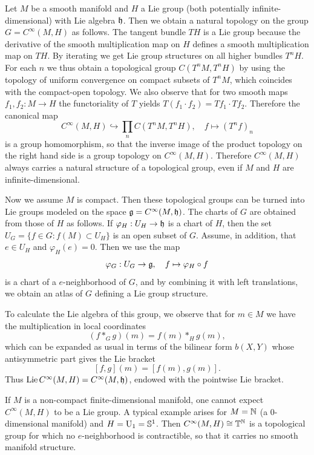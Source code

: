 \begin{example}
    Let $M$ be a smooth manifold and $H$ a Lie group (both potentially infinite-dimensional) with Lie algebra $\mathfrak{h}$. Then we obtain a natural topology on the group $G=C^\infty(M,H)$ as follows. The tangent bundle $TH$ is a Lie group because the derivative of the smooth  multiplication map on $H$ defines a smooth multiplication map on $TH$. By iterating we get Lie group structures on all higher bundles $T^n H$. For each $n$ we thus obtain a topological group $C(T^nM,T^nH)$ by using the topology of uniform convergence on compact subsets of $T^nM$, which coincides with the compact-open topology. We also observe that for two smooth maps $f_1,f_2:M\to H$ the functoriality of $T$ yields $T(f_1\cdot f_2)=Tf_1\cdot Tf_2.$ Therefore the canonical map
    \[C^\infty(M,H)\hookrightarrow \prod_{n}C(T^nM,T^nH),\quad f\mapsto (T^nf)_n\]
    is a group homomorphism, so that the inverse image of the product topology on the right hand side is a group topology on $C^\infty(M,H)$. Therefore $C^\infty(M,H)$ always carries a natural structure of a topological group, even if $M$ and $H$ are infinite-dimensional.

    Now we assume $M$ is compact. Then these topological groups can be turned into Lie groups modeled on the space $\mathfrak{g}=C^\infty(M,\mathfrak{h})$. The charts of $G$ are obtained from those of $H$ as follows. If $\varphi_H:U_H\to \mathfrak{h}$ is a chart of $H$, then the set $U_G=\{f\in G:f(M)\subset U_H\}$ is an open subset of $G$. Assume, in addition, that $e\in U_H$ and $\varphi_H(e)=0$. Then we use the map 
    \[\varphi_G:U_G\to\mathfrak{g},\quad f\mapsto \varphi_H\circ f\]
    is a chart of a $e$-neighborhood of $G$, and by combining it with left translations, we obtain an atlas of $G$ defining a Lie group structure.

    To calculate the Lie algebra of this group, we observe that for $m\in M$ we have the multiplication in local coordinates
    \[(f\ast_G g)(m)=f(m)\ast_H g(m),\]
    which can be expanded as usual in terms of the bilinear form $b(X,Y)$ whose antisymmetric part gives the Lie bracket
    \[[f,g](m)=[f(m),g(m)].\]
    Thus $\operatorname{Lie} C^\infty(M,H)=C^\infty(M,\mathfrak{h})$, endowed with the pointwise Lie bracket.
\end{example}

\begin{rem}
    If $M$ is a non-compact finite-dimensional manifold, one cannot expect $C^\infty(M,H)$ to be a Lie group. A typical example arises for $M=\mathbb{N}$ (a $0$-dimensional manifold) and $H=\operatorname{U}_1=\mathbb{S}^1$. Then $C^\infty(M,H)\cong \mathbb{T}^{\mathbb{N}}$ is a topological group for which no $e$-neighborhood is contractible, so that it carries no smooth manifold structure.
\end{rem}

